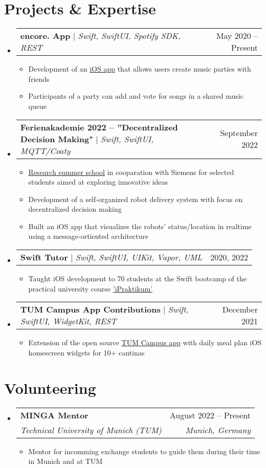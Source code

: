 \documentclass[letterpaper,11pt]{article}
\makeatletter
\newcommand{\resumeItem}[1]{
  \item\small{
    {#1 \vspace{-2pt}}
  }
}
\newcommand{\resumeSubheading}[4]{
  \vspace{-2pt}\item
    \begin{tabular*}{0.97\textwidth}[t]{l@{\extracolsep{\fill}}r}
      \textbf{#1} & #2 \\
      \textit{\small#3} & \textit{\small #4} \\
    \end{tabular*}\vspace{-7pt}
}
\newcommand{\resumeProjectHeading}[2]{
    \item
    \begin{tabular*}{0.97\textwidth}{l@{\extracolsep{\fill}}r}
      \small#1 & #2 \\
    \end{tabular*}\vspace{-7pt}
}
\newcommand{\resumeSubHeadingListStart}{\begin{itemize}[leftmargin=0.15in, label={}]}
\newcommand{\resumeSubHeadingListEnd}{\end{itemize}}
\newcommand{\resumeItemListStart}{\begin{itemize}}
\newcommand{\resumeItemListEnd}{\end{itemize}\vspace{-5pt}}
\makeatother
\begin{document}
\section{Projects \& Expertise}
    \resumeSubHeadingListStart
    \resumeProjectHeading
          {\textbf{encore. App} $|$ \emph{Swift, SwiftUI, Spotify SDK, REST}}{May 2020 -- Present}
          \resumeItemListStart
            \resumeItem{Development of an \href{https://github.com/NikolaiMadlener/EncoreApp}{iOS app} that allows users create music parties with friends}
            \resumeItem{Participants of a party can add and vote for songs in a shared music queue}
          \resumeItemListEnd

    \resumeProjectHeading
      {\textbf{Ferienakademie 2022 -- ”Decentralized Decision Making"}  $|$ \emph{Swift, SwiftUI, MQTT/Coaty}}{September 2022}
      \resumeItemListStart
        \resumeItem{\href{https://ase.in.tum.de/lehrstuhl_1/projects/1193-ferienakademie-2022}{Research summer school} in cooparation with Siemens for selected students aimed at exploring innovative ideas}
        \resumeItem{Development of a self-organized robot delivery system with focus on decentralized decision making}
        \resumeItem{Built an iOS app that visualizes the robots' status/location in realtime using a message-ortiented architecture}
      \resumeItemListEnd

      \resumeProjectHeading
          {\textbf{Swift Tutor} $|$ \emph{Swift, SwiftUI, UIKit, Vapor, UML}}{2020, 2022}
          \resumeItemListStart
            \resumeItem{Taught iOS development to 70 students at the Swift bootcamp of the practical university course \href{https://ase.in.tum.de/lehrstuhl_1/teaching/159-teaching/wt2223/1201-ipraktikum-ws2223}{'iPraktikum'}}
          \resumeItemListEnd

      \resumeProjectHeading
          {\textbf{TUM Campus App Contributions} $|$ \emph{Swift, SwiftUI, WidgetKit, REST}}{December 2021}
          \resumeItemListStart
            \resumeItem{Extension of the open source \href{https://github.com/TUM-Dev/Campus-iOS}{TUM Campus app} with daily meal plan iOS homescreen widgets for 10+ cantinas}
          \resumeItemListEnd

    \resumeSubHeadingListEnd

\section{Volunteering}
\resumeSubHeadingListStart
  \resumeSubheading
    {MINGA Mentor}{August 2022 -- Present}
    {Technical University of Munich (TUM)}{Munich, Germany}
    \resumeItemListStart
    \resumeItem{Mentor for incomming exchange students to guide them during their time in Munich and at TUM}
  \resumeItemListEnd
\resumeSubHeadingListEnd
\end{document}

